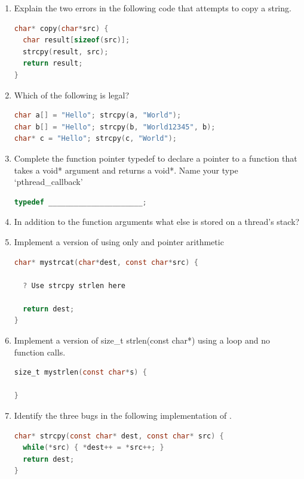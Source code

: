 \begin{enumerate}
\item Explain the two errors in the following code that attempts to copy a string.

\begin{lstlisting}[language=C]
char* copy(char*src) {
  char result[sizeof(src)];
  strcpy(result, src);
  return result;
}
\end{lstlisting}

\item Which of the following is legal?

\begin{lstlisting}[language=C]
char a[] = "Hello"; strcpy(a, "World");
char b[] = "Hello"; strcpy(b, "World12345", b);
char* c = "Hello"; strcpy(c, "World");
\end{lstlisting}

\item Complete the function pointer typedef to declare a pointer to a function that takes a void* argument and returns a void*. Name your type `pthread\_callback'

\begin{lstlisting}[language=C]
typedef ______________________;
\end{lstlisting}

\item In addition to the function arguments what else is stored on a thread's stack?

\item Implement a version of  using only   and pointer arithmetic

\begin{lstlisting}[language=C]
char* mystrcat(char*dest, const char*src) {

  ? Use strcpy strlen here

  return dest;
}
\end{lstlisting}

\item Implement a version of size\_t strlen(const char*) using a loop and no function calls.

\begin{lstlisting}[language=C]
size_t mystrlen(const char*s) {

}
\end{lstlisting}

\item Identify the three bugs in the following implementation of .

\begin{lstlisting}[language=C]
char* strcpy(const char* dest, const char* src) {
  while(*src) { *dest++ = *src++; }
  return dest;
}
\end{lstlisting}

\end{enumerate}

